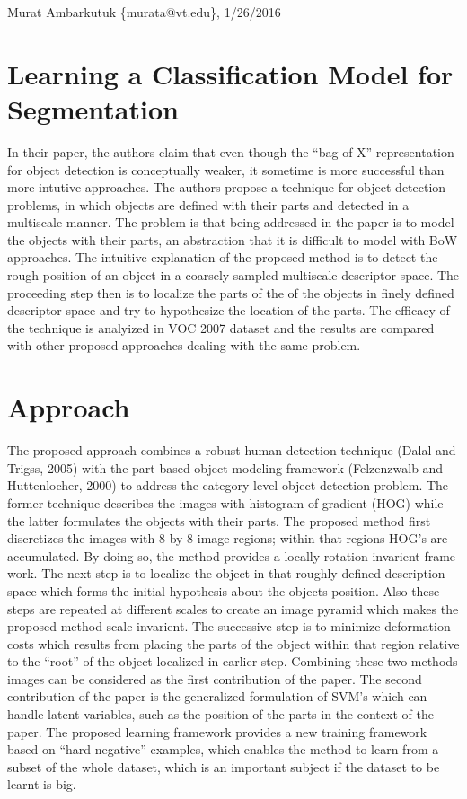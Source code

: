 \documentclass[11pt]{article}
\begin{document}
\thispagestyle{empty}
\begin{flushright}
	\small{Murat Ambarkutuk \{murata@vt.edu\}, 1/26/2016}
\end{flushright}
\section{Learning a Classification Model for Segmentation}
In their paper, the authors claim that even though the ``bag-of-X'' representation for object detection is conceptually weaker, it sometime is more successful than more intutive approaches.
The authors propose a technique for object detection problems, in which objects are defined with their parts and detected in a multiscale manner.
The problem is that being addressed in the paper is to model the objects with their parts, an abstraction that it is difficult to model with BoW approaches.
The intuitive explanation of the proposed method is to detect the rough position of an object in a coarsely sampled-multiscale descriptor space.
The proceeding step then is to localize the parts of the of the objects in finely defined descriptor space and try to hypothesize the location of the parts.
The efficacy of the technique is analyized in VOC 2007 dataset and the results are compared with other proposed approaches dealing with the same problem.
\section{Approach}
\indent The proposed approach combines a robust human detection technique (Dalal and Trigss, 2005) with the part-based object modeling framework (Felzenzwalb and Huttenlocher, 2000) to address the category level object detection problem.
The former technique describes the images with histogram of gradient (HOG) while the latter formulates the objects with their parts.
The proposed method first discretizes the images with 8-by-8 image regions; within that regions HOG's are accumulated.
By doing so, the method provides a locally rotation invarient frame work.
The next step is to localize the object in that roughly defined description space which forms the initial hypothesis about the objects position.
Also these steps are repeated at different scales to create an image pyramid which makes the proposed method scale invarient.
The successive step is to minimize deformation costs which results from placing the parts of the object within that region relative to the ``root'' of the object localized in earlier step.
Combining these two methods images can be considered as the first contribution of the paper. The second contribution of the paper is the generalized formulation of SVM's which can handle latent variables, such as the position of the parts in the context of the paper.
The proposed learning framework provides a new training framework based on ``hard negative'' examples, which enables the method to learn from a subset of the whole dataset, which is an important subject if the dataset to be learnt is big.
\end{document}
